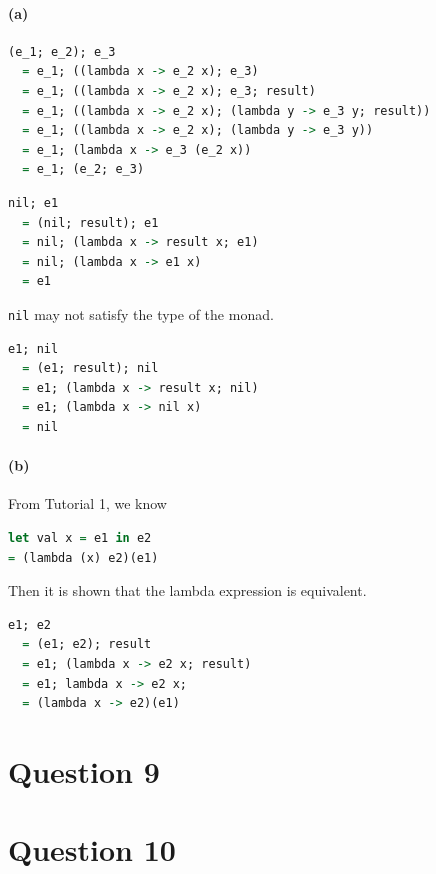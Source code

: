 \documentclass[11pt]{article} %
\begin{document}
\paragraph{(a)}
\begin{lstlisting}[language=Haskell]
  (e_1; e_2); e_3
  = e_1; ((lambda x -> e_2 x); e_3)
  = e_1; ((lambda x -> e_2 x); e_3; result)
  = e_1; ((lambda x -> e_2 x); (lambda y -> e_3 y; result))
  = e_1; ((lambda x -> e_2 x); (lambda y -> e_3 y))
  = e_1; (lambda x -> e_3 (e_2 x))
  = e_1; (e_2; e_3)
\end{lstlisting}
\begin{lstlisting}[language=Haskell]
  nil; e1
  = (nil; result); e1
  = nil; (lambda x -> result x; e1)
  = nil; (lambda x -> e1 x)
  = e1
\end{lstlisting}
\texttt{nil} may not satisfy the type of the monad.
\begin{lstlisting}[language=Haskell]
  e1; nil
  = (e1; result); nil
  = e1; (lambda x -> result x; nil)
  = e1; (lambda x -> nil x)
  = nil
\end{lstlisting}

\paragraph{(b)}
From Tutorial 1, we know
\begin{lstlisting}[language=Haskell]
let val x = e1 in e2
= (lambda (x) e2)(e1)
\end{lstlisting}
Then it is shown that the lambda expression is equivalent.
\begin{lstlisting}[language=Haskell]
  e1; e2 
  = (e1; e2); result
  = e1; (lambda x -> e2 x; result)
  = e1; lambda x -> e2 x;
  = (lambda x -> e2)(e1)
\end{lstlisting}

\section*{Question 9}


\clearpage
\section*{Question 10}

\end{document}
